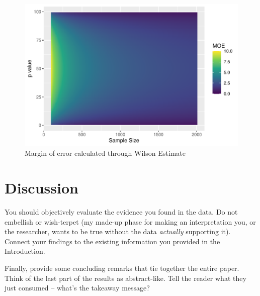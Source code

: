 \documentclass{article}\usepackage[]{graphicx}\usepackage[]{xcolor}
\begin{document}
\begin{multicols}{2}
\begin{figure}[H]
 \begin{center}
 \includegraphics[scale=0.6]{wilson_moe.pdf}
 \caption{Margin of error calculated through Wilson Estimate}
 \label{plot4}
 \end{center}
 \end{figure}




\section{Discussion}
 You should objectively evaluate the evidence you found in the data. Do not embellish or wish-terpet (my made-up phase for making an interpretation you, or the researcher, wants to be true without the data \emph{actually} supporting it). Connect your findings to the existing information you provided in the Introduction.

Finally, provide some concluding remarks that tie together the entire paper. Think of the last part of the results as abstract-like. Tell the reader what they just consumed -- what's the takeaway message?

\vspace{2em}


\begin{tiny}

\end{tiny}
\end{multicols}

\end{document}

